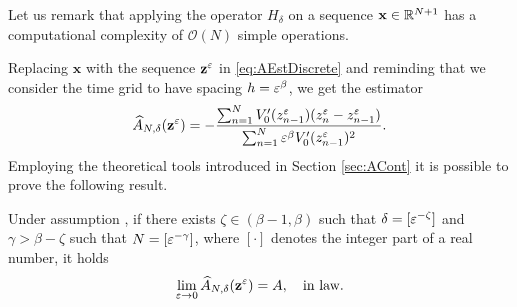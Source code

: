 \documentclass[10pt]{article}
\begin{document}
\begin{remark} Let us remark that applying the operator $H_\delta$ on a sequence $\mathbf x \in \mathbb{R}^{N+1}$ has a computational complexity of $\mathcal O(N)$ simple operations. 
\end{remark}

Replacing $\mathbf x$ with the sequence $\mathbf z^\varepsilon$ in \eqref{eq:AEstDiscrete} and reminding that we consider the time grid to have spacing $h = \varepsilon^\beta$, we get the estimator 
\begin{equation}\label{eq:AEstDiscreteZ}
	\widehat A_{N, \delta}(\mathbf z^\varepsilon) = -\frac{\sum_{n=1}^{N}V_0'(z^\varepsilon_{n-1})(z^\varepsilon_n - z^\varepsilon_{n-1})}{\sum_{n=1}^{N} \varepsilon^\beta V_0'(z^\varepsilon_{n-1})^2}.
\end{equation}
Employing the theoretical tools introduced in Section \ref{sec:ACont} it is possible to prove the following result.
\begin{theorem}\label{thm:DriftDiscrete} Under assumption , if there exists $\zeta \in (\beta - 1, \beta)$ such that $\delta = [\varepsilon^{-\zeta}]$ and $\gamma > \beta - \zeta$ such that $N = [\varepsilon^{-\gamma}]$, where $[\cdot]$ denotes the integer part of a real number, it holds 
	\begin{equation}
	\lim_{\varepsilon\to 0} \widehat A_{N, \delta}(\mathbf z^\varepsilon) = A, \quad \text{in law}.
	\end{equation}
\end{theorem}
\end{document}
